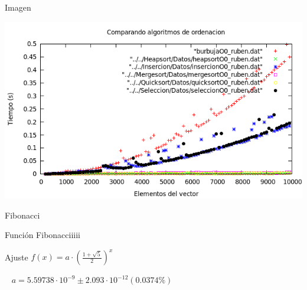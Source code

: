 \documentclass[compress]{beamer}
\begin{document}
\begin{frame}
	\begin{alertblock}{Imagen}
	\begin{center}
	\includegraphics[scale=0.45]{../Graficas/todos.png}
	\end{center}
	\end{alertblock}
\end{frame}




\begin{frame}{Fibonacci}
	\begin{block}{Función}
		Fibonacciiiii
	\end{block}
	
	\begin{block}{Ajuste}
	$ f(x) = a\cdot   \left( \displaystyle\frac{1+\sqrt5}{2} \right)^x $

	{\ }
	$a               = 5.59738\cdot 10^{-9}      \pm 2.093\cdot 10^{-12}    (0.0374\%)$
	\end{block}
\end{frame}
\end{document}
